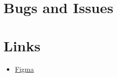 \documentclass{article}
\begin{document}
\newpage

\section{Bugs and Issues}

\newpage
\section{Links}
\begin{itemize}
    \item \href{https://www.figma.com/design/LqO6EM0LpA8Q7YLeUj8eEN/Bachelor?node-id=0-1&t=Ogt33dzuluNJpiJL-1}{Figma}
\end{itemize}
\end{document}
